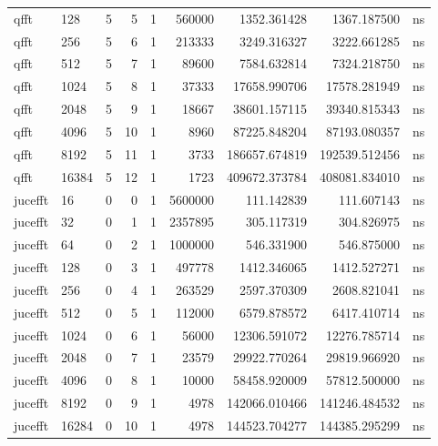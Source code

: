 \begin{tabular}{llrrrrrrl}
qfft & 128 & 5 & 5 & 1 & 560000 & 1352.361428 & 1367.187500 & ns \\
qfft & 256 & 5 & 6 & 1 & 213333 & 3249.316327 & 3222.661285 & ns \\
qfft & 512 & 5 & 7 & 1 & 89600 & 7584.632814 & 7324.218750 & ns \\
qfft & 1024 & 5 & 8 & 1 & 37333 & 17658.990706 & 17578.281949 & ns \\
qfft & 2048 & 5 & 9 & 1 & 18667 & 38601.157115 & 39340.815343 & ns \\
qfft & 4096 & 5 & 10 & 1 & 8960 & 87225.848204 & 87193.080357 & ns \\
qfft & 8192 & 5 & 11 & 1 & 3733 & 186657.674819 & 192539.512456 & ns \\
qfft & 16384 & 5 & 12 & 1 & 1723 & 409672.373784 & 408081.834010 & ns \\
jucefft & 16 & 0 & 0 & 1 & 5600000 & 111.142839 & 111.607143 & ns \\
jucefft & 32 & 0 & 1 & 1 & 2357895 & 305.117319 & 304.826975 & ns \\
jucefft & 64 & 0 & 2 & 1 & 1000000 & 546.331900 & 546.875000 & ns \\
jucefft & 128 & 0 & 3 & 1 & 497778 & 1412.346065 & 1412.527271 & ns \\
jucefft & 256 & 0 & 4 & 1 & 263529 & 2597.370309 & 2608.821041 & ns \\
jucefft & 512 & 0 & 5 & 1 & 112000 & 6579.878572 & 6417.410714 & ns \\
jucefft & 1024 & 0 & 6 & 1 & 56000 & 12306.591072 & 12276.785714 & ns \\
jucefft & 2048 & 0 & 7 & 1 & 23579 & 29922.770264 & 29819.966920 & ns \\
jucefft & 4096 & 0 & 8 & 1 & 10000 & 58458.920009 & 57812.500000 & ns \\
jucefft & 8192 & 0 & 9 & 1 & 4978 & 142066.010466 & 141246.484532 & ns \\
jucefft & 16284 & 0 & 10 & 1 & 4978 & 144523.704277 & 144385.295299 & ns \\
\bottomrule
\end{tabular}
